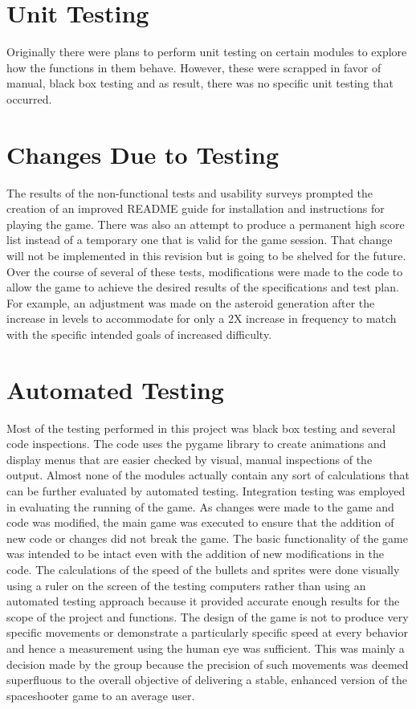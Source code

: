 \documentclass[12pt, titlepage]{article}
\begin{document}
\section{Unit Testing}
Originally there were plans to perform unit testing on certain modules to explore how the functions in them behave. However, these were scrapped in favor of manual, black box testing and as result, there was no specific unit testing that occurred.

\section{Changes Due to Testing}
The results of the non-functional tests and usability surveys prompted the creation of an improved README guide for installation and instructions for playing the game. There was also an attempt to produce a permanent high score list instead of a temporary one that is valid for the game session. That change will not be implemented in this revision but is going to be shelved for the future. Over the course of several of these tests, modifications were made to the code to allow the game to achieve the desired results of the specifications and test plan. For example, an adjustment was made on the asteroid generation after the increase in levels to accommodate for only a 2X increase in frequency to match with the specific intended goals of increased difficulty. 

\section{Automated Testing}
Most of the testing performed in this project was black box testing and several code inspections. The code uses the pygame library to create animations and display menus that are easier checked by visual, manual inspections of the output. Almost none of the modules actually contain any sort of calculations that can be further evaluated by automated testing. Integration testing was employed in evaluating the running of the game. As changes were made to the game and code was modified, the main game was executed to ensure that the addition of new code or changes did not break the game. The basic functionality of the game was intended to be intact even with the addition of new modifications in the code. The calculations of the speed of the bullets and sprites were done visually using a ruler on the screen of the testing computers rather than using an automated testing approach because it provided accurate enough results for the scope of the project and functions. The design of the game is not to produce very specific movements or demonstrate a particularly specific speed at every behavior and hence a measurement using the human eye was sufficient. This was mainly a decision made by the group because the precision of such movements was deemed superfluous to the overall objective of delivering a stable, enhanced version of the  spaceshooter game to an average user. 
    
\end{document}

